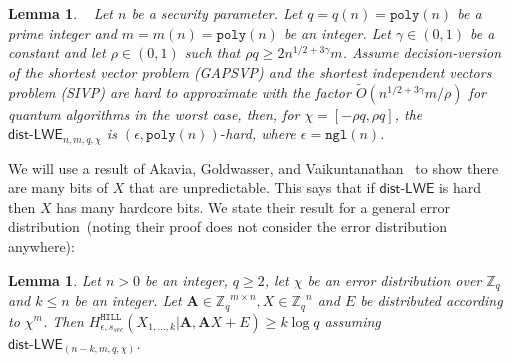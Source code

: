 \documentclass[11pt]{article}
\newcommand{\class}[1]{{\ensuremath{\mathsf{#1}}}}
\newcommand{\vect}[1]{\ensuremath{\textbf{#1}}}
\newcommand{\zq}{\ensuremath{\mathbb{Z}_q}}
\newcommand{\hill}{\ensuremath{\mathtt{HILL}}\xspace}
\newcommand{\poly}{\ensuremath{\mathtt{poly}}\xspace}
\newcommand{\ngl}{\ensuremath{\mathtt{ngl}}\xspace}
\newcommand{\distLWE}{\ensuremath{\class{dist\mbox{-}LWE}}}
\newtheorem{lemma}[theorem]{Lemma}
\newcommand{\vA}{\vect{A}}
\begin{document}
\begin{lemma}~
\label{lem:uniform LWE decision}
Let $n$ be a security parameter.  Let $q = q(n) = \poly(n)$ be a prime integer and $m = m(n) = \poly(n)$ be an integer. Let $\gamma\in (0, 1)$ be a constant and let $\rho\in (0,1)$ such that $\rho q \geq 2n^{1/2+3\gamma}m$. Assume decision-version of the shortest vector problem (GAPSVP) and the shortest independent vectors problem (SIVP) are hard to approximate with the factor $\tilde{O}(n^{1/2+3\gamma}m/\rho)$ for quantum algorithms in the worst case, then, for $\chi = [-\rho q, \rho q]$, the $\distLWE_{n, m, q, \chi}$ is $(\epsilon, \poly(n))\mbox{-}$hard, where $\epsilon = \ngl(n)$.
\end{lemma}

We will use a result of Akavia, Goldwasser, and Vaikuntanathan~\cite{akavia2009} to show there are many bits of $X$ that are unpredictable.  This says that if $\distLWE$ is hard then $X$ has many hardcore bits.  We state their result for a general error distribution~(noting their proof does not consider the error distribution anywhere):
\begin{lemma}
\label{lem:many hardcore bits}
Let $n>0$ be an integer, $q\geq 2$, let $\chi$ be an error distribution over $\zq$ and $k\leq n$ be an integer.  Let $\vA\in \zq^{m\times n} , X\in\zq^n$ and $E$ be distributed according to $\chi^m$.  Then $H^{\hill}_{\epsilon, s_{sec}}(X_{1,..., k}| \vA, \vA X+E )\geq k\log q$ assuming $\distLWE_{(n-k, m, q, \chi)}$.
\end{lemma}
\end{document}
